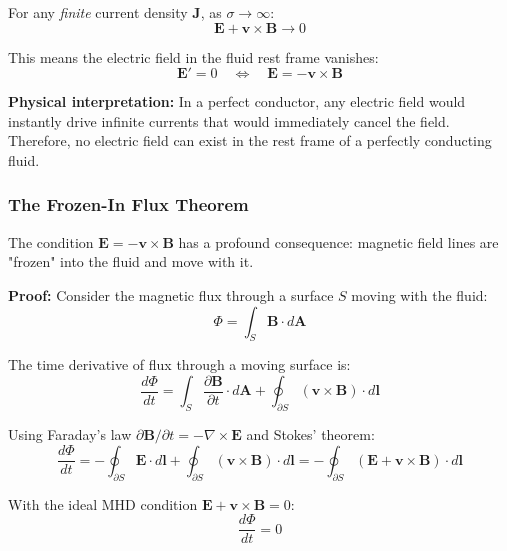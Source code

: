 \documentclass[12pt,a4paper]{article}
\begin{document}
For any \textit{finite} current density $\bm{J}$, as $\sigma \to \infty$:
\begin{equation}
\bm{E} + \bm{v} \times \bm{B} \to 0
\label{eq:perfect_conductor_limit}
\end{equation}

This means the electric field in the fluid rest frame vanishes:
\begin{equation}
\boxed{\bm{E}' = 0 \quad \Leftrightarrow \quad \bm{E} = -\bm{v} \times \bm{B}}
\label{eq:ideal_mhd_condition}
\end{equation}

\textbf{Physical interpretation:} In a perfect conductor, any electric field would
instantly drive infinite currents that would immediately cancel the field. Therefore,
no electric field can exist in the rest frame of a perfectly conducting fluid.

\subsubsection{The Frozen-In Flux Theorem}

The condition $\bm{E} = -\bm{v} \times \bm{B}$ has a profound consequence: magnetic
field lines are "frozen" into the fluid and move with it.

\textbf{Proof:} Consider the magnetic flux through a surface $S$ moving with the fluid:
\begin{equation}
\Phi = \int_S \bm{B} \cdot d\bm{A}
\end{equation}

The time derivative of flux through a moving surface is:
\begin{equation}
\frac{d\Phi}{dt} = \int_S \frac{\partial \bm{B}}{\partial t} \cdot d\bm{A}
+ \oint_{\partial S} (\bm{v} \times \bm{B}) \cdot d\bm{l}
\label{eq:flux_derivative}
\end{equation}

Using Faraday's law $\partial \bm{B}/\partial t = -\nabla \times \bm{E}$ and
Stokes' theorem:
\begin{equation}
\frac{d\Phi}{dt} = -\oint_{\partial S} \bm{E} \cdot d\bm{l}
+ \oint_{\partial S} (\bm{v} \times \bm{B}) \cdot d\bm{l}
= -\oint_{\partial S} (\bm{E} + \bm{v} \times \bm{B}) \cdot d\bm{l}
\end{equation}

With the ideal MHD condition $\bm{E} + \bm{v} \times \bm{B} = 0$:
\begin{equation}
\boxed{\frac{d\Phi}{dt} = 0}
\label{eq:frozen_flux}
\end{equation}
\end{document}
